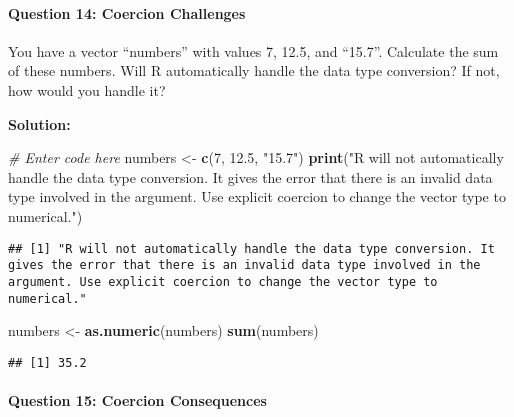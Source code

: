 \documentclass[
]{article}
\newenvironment{Shaded}{\begin{snugshade}}{\end{snugshade}}
\newcommand{\CommentTok}[1]{\textcolor[rgb]{0.56,0.35,0.01}{\textit{#1}}}
\newcommand{\DecValTok}[1]{\textcolor[rgb]{0.00,0.00,0.81}{#1}}
\newcommand{\FloatTok}[1]{\textcolor[rgb]{0.00,0.00,0.81}{#1}}
\newcommand{\FunctionTok}[1]{\textcolor[rgb]{0.13,0.29,0.53}{\textbf{#1}}}
\newcommand{\NormalTok}[1]{#1}
\newcommand{\OtherTok}[1]{\textcolor[rgb]{0.56,0.35,0.01}{#1}}
\newcommand{\StringTok}[1]{\textcolor[rgb]{0.31,0.60,0.02}{#1}}
\begin{document}
\hypertarget{question-14-coercion-challenges}{%
\paragraph{Question 14: Coercion
Challenges}\label{question-14-coercion-challenges}}

You have a vector ``numbers'' with values 7, 12.5, and ``15.7''.
Calculate the sum of these numbers. Will R automatically handle the data
type conversion? If not, how would you handle it?

\textbf{Solution:}

\begin{Shaded}
\begin{Highlighting}[]
\CommentTok{\# Enter code here}
\NormalTok{numbers }\OtherTok{\textless{}{-}} \FunctionTok{c}\NormalTok{(}\DecValTok{7}\NormalTok{, }\FloatTok{12.5}\NormalTok{, }\StringTok{"15.7"}\NormalTok{)}
\FunctionTok{print}\NormalTok{(}\StringTok{"R will not automatically handle the data type conversion. It gives the error that there is an invalid data type involved in the argument. Use explicit coercion to change the vector type to numerical."}\NormalTok{)}
\end{Highlighting}
\end{Shaded}

\begin{verbatim}
## [1] "R will not automatically handle the data type conversion. It gives the error that there is an invalid data type involved in the argument. Use explicit coercion to change the vector type to numerical."
\end{verbatim}

\begin{Shaded}
\begin{Highlighting}[]
\NormalTok{numbers }\OtherTok{\textless{}{-}} \FunctionTok{as.numeric}\NormalTok{(numbers)}
\FunctionTok{sum}\NormalTok{(numbers)}
\end{Highlighting}
\end{Shaded}

\begin{verbatim}
## [1] 35.2
\end{verbatim}

\hypertarget{question-15-coercion-consequences}{%
\paragraph{Question 15: Coercion
Consequences}\label{question-15-coercion-consequences}}
\end{document}
